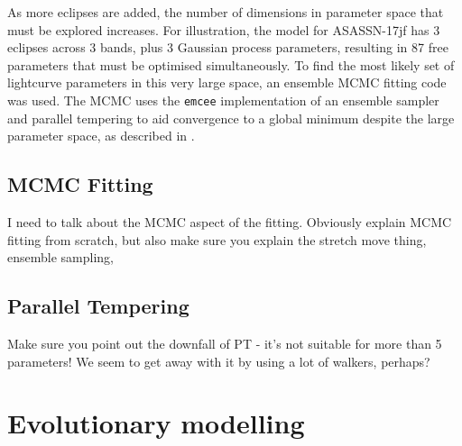 As more eclipses are added, the number of dimensions in parameter space that must be explored increases. For illustration, the model for ASASSN-17jf has 3 eclipses across 3 bands, plus 3 Gaussian process parameters, resulting in 87 free parameters that must be optimised simultaneously. To find the most likely set of lightcurve parameters in this very large space, an ensemble MCMC fitting code was used. The MCMC uses the \texttt{emcee} implementation of an ensemble sampler and parallel tempering \citep{foreman2012} to aid convergence to a global minimum despite the large parameter space, as described in \citet{McAllister2019}.




\subsection{MCMC Fitting}
I need to talk about the MCMC aspect of the fitting. Obviously explain MCMC fitting from scratch, but also make sure you explain the stretch move thing, ensemble sampling, 

\subsection{Parallel Tempering}
Make sure you point out the downfall of PT - it's not suitable for more than 5 parameters! We seem to get away with it by using a lot of walkers, perhaps?


\section{Evolutionary modelling}
\label{sect:method:evolutionary modelling}